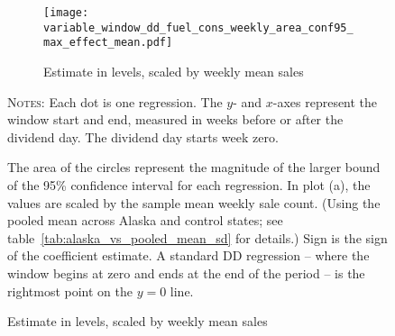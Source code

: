 \documentclass[11pt,letterpaper,oneside]{article}
\newcommand{\varWindowDDnotes}{%
Each dot is one regression.
The $y$- and $x$-axes represent the window start and end, measured in weeks before or after the dividend day.
The dividend day starts week zero.

 The area of the circles represent the magnitude of the larger bound of the 95\% confidence interval for each regression.
In plot (a), the values are scaled by the sample mean weekly sale count.
(Using the pooled mean across Alaska and control states; see table~\ref{tab:alaska_vs_pooled_mean_sd} for details.)
Sign is the sign of the coefficient estimate. %
A standard DD regression -- where the window begins at zero and ends at the end of the period -- is the rightmost point on the $y=0$ line.
}
\begin{document}
\begin{figure}[hbtp]
    \caption{Fuel consumption effects with varying windows}
    \label{fig:variable_window_fuel_cons}
    \begin{subfigure}{0.97\linewidth}
        \caption{Estimate in levels, scaled by weekly mean sales}
        \texttt{[image: variable\_window\_dd\_fuel\_cons\_weekly\_area\_conf95\_max\_effect\_mean.pdf]}
    \end{subfigure}

    {\footnotesize
    \textsc{Notes:}
    \varWindowDDnotes
    }
\end{figure}
\end{document}
